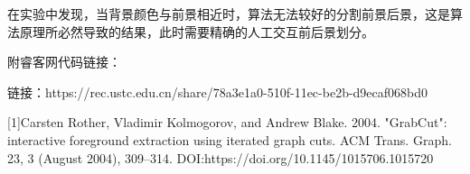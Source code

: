\documentclass[12pt]{article}
\begin{document}
	在实验中发现，当背景颜色与前景相近时，算法无法较好的分割前景后景，这是算法原理所必然导致的结果，此时需要精确的人工交互前后景划分。
	
	附睿客网代码链接：
	
	链接：https://rec.ustc.edu.cn/share/78a3e1a0-510f-11ec-be2b-d9ecaf068bd0
	
	\begin{thebibliography}{99}
	
		[1]Carsten Rother, Vladimir Kolmogorov, and Andrew Blake. 2004. "GrabCut": interactive foreground extraction using iterated graph cuts. ACM Trans. Graph. 23, 3 (August 2004), 309–314. DOI:https://doi.org/10.1145/1015706.1015720
		
	\end{thebibliography}
\end{document}

